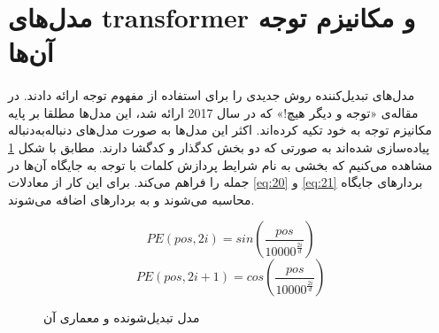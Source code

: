 \section{
    مدل‌های transformer و مکانیزم توجه آن‌ها
}
\label{sec:transformers}
\paragraph{}{
    مدل‌های تبدیل‌کننده روش جدیدی را برای استفاده‌ از مفهوم توجه ارائه دادند.
    در مقاله‌‌ی «توجه و دیگر هیچ!» 
    \cite{NIPS2017_3f5ee243}
    که در سال 2017 ارائه شد، این مدل‌ها مطلقا بر پایه 
    مکانیزم توجه به خود تکیه کرده‌اند. اکثر این مدل‌ها به صورت 
    مدل‌های دنباله‌به‌دنباله پیاده‌سازی شده‌اند به صورتی که دو بخش
    کدگذار و کدگشا دارند. مطابق با شکل
    \ref{fig:transformers_arc_1}
    مشاهده‌ می‌کنیم که بخشی به نام  
    شرایط پردازش کلمات با توجه به جایگاه آن‌ها در جمله را فراهم می‌کند. 
    برای این کار از معادلات 
    \ref{eq:20} و \ref{eq:21}
    بردارهای جایگاه محاسبه می‌شوند و به بردار‌های 
    اضافه می‌شوند. 
    \begin{center}
        \begin{equation} \label{eq:20}
            PE(pos, 2i) = sin(\frac{pos}{10000^{\frac{2i}{d}}})
        \end{equation}
        \begin{equation} \label{eq:21}
            PE(pos, 2i + 1) = cos(\frac{pos}{10000^{\frac{2i}{d}}})
        \end{equation}
    \end{center}
    \begin{figure}[H]
        \caption{مدل‌ تبدیل‌شونده و معماری آن‌}
        \label{fig:transformers_arc_1}
    \end{figure}

}
